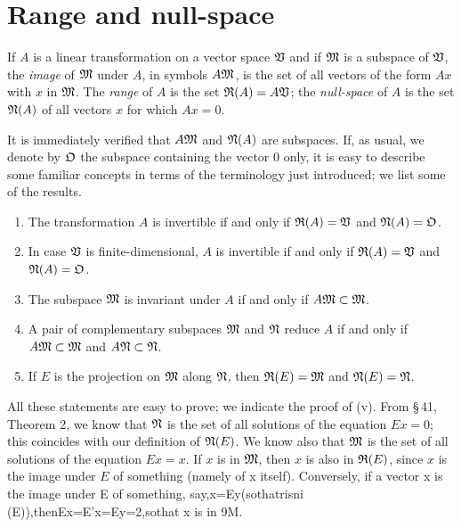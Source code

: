 \section{Range and null-space}

\begin{definition}
    If \(A\) is a linear transformation on a vector space \(\mathfrak{V}\) and if
    \(\frak{M}\) is a subspace of \(\mathfrak{V}\), the \emph{image} of \(\frak{M}\)
    under \(A\), in symbols \(A\frak{M}\), is the set of all vectors of the form
    \(Ax\) with \(x\) in \(\frak{M}\). The \emph{range} of \(A\) is the set
    \(\frak{R}(A) = A\mathfrak{V}\); the \emph{null-space} of \(A\) is the set
    \(\frak{N}(A)\) of all vectors \(x\) for which \(Ax = 0\).
\end{definition}

It is immediately verified that \(A\frak{M}\) and \(\frak{N}(A)\) are
subspaces. If, as usual, we denote by \(\frak{O}\) the subspace containing the
vector \(0\) only, it is easy to describe some familiar concepts in terms of the
terminology just introduced; we list some of the results.

\begin{enumerate}[label=(\roman*), wide, nosep]
    \item The transformation \(A\) is invertible if and only if \(\frak{R}(A) =
    \mathfrak{V}\) and \(\frak{N}(A) = \frak{O}\).
    \item In case \(\mathfrak{V}\) is finite-dimensional, \(A\) is invertible if and
    only if \(\frak{R}(A) = \mathfrak{V}\) and \(\frak{N}(A) = \frak{O}\).
    \item The subspace \(\frak{M}\) is invariant under \(A\) if and only if
    \(A\frak{M} \subset \frak{M}\).
    \item A pair of complementary subspaces \(\frak{M}\) and \(\frak{N}\) reduce
    \(A\) if and only if \(A\frak{M} \subset \frak{M}\) and \(A\frak{N}
    \subset \frak{N}\).
    \item If \(E\) is the projection on \(\frak{M}\) along \(\frak{N}\), then
    \(\frak{R}(E) = \frak{M}\) and \(\frak{N}(E) = \frak{N}\).
\end{enumerate}

All these statements are easy to prove; we indicate the proof of (v). From
\S\,41, Theorem 2, we know that \(\frak{N}\) is the set of all solutions of the
equation \(Ex = 0\); this coincides with our definition of \(\frak{N}(E)\). We
know also that \(\frak{M}\) is the set of all solutions of the equation \(Ex =
x\). If \(x\) is in \(\frak{M}\), then \(x\) is also in \(\frak{R}(E)\), since
\(x\) is the image under \(E\) of something (namely of x itself). Conversely, if
a vector x is the image under E of something, say,x=Ey(sothatrisni
(E)),thenEx=E'x=Ey=2,sothat x is in 9M.

